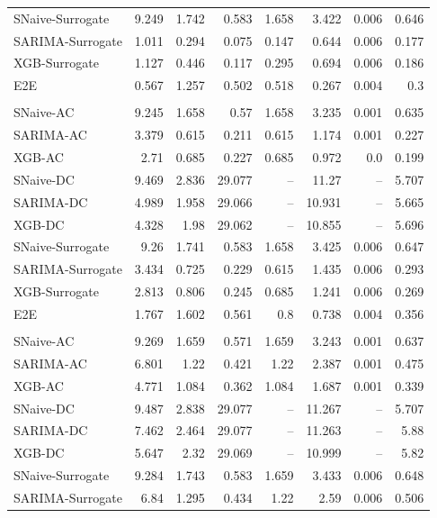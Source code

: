 \begin{longtable}{lrrrrrrr}
SNaive-Surrogate & 9.249 & 1.742 & 0.583 & 1.658 & 3.422 & 0.006 & 0.646 \\
SARIMA-Surrogate & 1.011 & 0.294 & 0.075 & 0.147 & 0.644 & 0.006 & 0.177 \\
XGB-Surrogate & 1.127 & 0.446 & 0.117 & 0.295 & 0.694 & 0.006 & 0.186 \\
E2E & 0.567 & 1.257 & 0.502 & 0.518 & 0.267 & 0.004 & 0.3 \\
\addlinespace[2pt]
\multicolumn{8}{@{}l}{\quad Horizon $H=6$} \\[2pt]
SNaive-AC & 9.245 & 1.658 & 0.57 & 1.658 & 3.235 & 0.001 & 0.635 \\
SARIMA-AC & 3.379 & 0.615 & 0.211 & 0.615 & 1.174 & 0.001 & 0.227 \\
XGB-AC & 2.71 & 0.685 & 0.227 & 0.685 & 0.972 & 0.0 & 0.199 \\
SNaive-DC & 9.469 & 2.836 & 29.077 & -- & 11.27 & -- & 5.707 \\
SARIMA-DC & 4.989 & 1.958 & 29.066 & -- & 10.931 & -- & 5.665 \\
XGB-DC & 4.328 & 1.98 & 29.062 & -- & 10.855 & -- & 5.696 \\
SNaive-Surrogate & 9.26 & 1.741 & 0.583 & 1.658 & 3.425 & 0.006 & 0.647 \\
SARIMA-Surrogate & 3.434 & 0.725 & 0.229 & 0.615 & 1.435 & 0.006 & 0.293 \\
XGB-Surrogate & 2.813 & 0.806 & 0.245 & 0.685 & 1.241 & 0.006 & 0.269 \\
E2E & 1.767 & 1.602 & 0.561 & 0.8 & 0.738 & 0.004 & 0.356 \\
\addlinespace[2pt]
\multicolumn{8}{@{}l}{\quad Horizon $H=24$} \\[2pt]
SNaive-AC & 9.269 & 1.659 & 0.571 & 1.659 & 3.243 & 0.001 & 0.637 \\
SARIMA-AC & 6.801 & 1.22 & 0.421 & 1.22 & 2.387 & 0.001 & 0.475 \\
XGB-AC & 4.771 & 1.084 & 0.362 & 1.084 & 1.687 & 0.001 & 0.339 \\
SNaive-DC & 9.487 & 2.838 & 29.077 & -- & 11.267 & -- & 5.707 \\
SARIMA-DC & 7.462 & 2.464 & 29.077 & -- & 11.263 & -- & 5.88 \\
XGB-DC & 5.647 & 2.32 & 29.069 & -- & 10.999 & -- & 5.82 \\
SNaive-Surrogate & 9.284 & 1.743 & 0.583 & 1.659 & 3.433 & 0.006 & 0.648 \\
SARIMA-Surrogate & 6.84 & 1.295 & 0.434 & 1.22 & 2.59 & 0.006 & 0.506 \\

\end{longtable}
